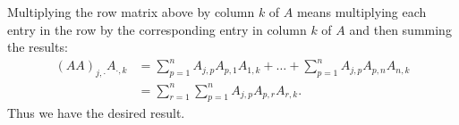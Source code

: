 \documentclass[a5paper]{article}
\begin{document}
    Multiplying the row matrix above by column $k$ of $A$ means multiplying each entry in the row by the corresponding entry in column $k$ of $A$ and then summing the results:
\begin{align*}
        (AA)_{j,\cdot}A_{\cdot,k} &= \sum_{p=1}^n A_{j,p}A_{p,1} A_{1,k} + \dots + \sum_{p=1}^n A_{j,p}A_{p,n}A_{n,k} \\
                                  &= \sum_{r=1}^n \sum_{p=1}^n A_{j,p} A_{p,r} A_{r,k} .
\end{align*}
    Thus we have the desired result.
\end{document}
